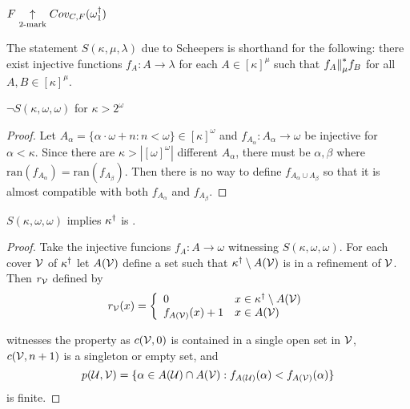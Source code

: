   \begin{corollary}
    $F\underset{2\text{-mark}}{\uparrow}Cov_{C,F}(\omega_1^\dagger)$
  \end{corollary}

  \begin{definition} 
    The statement $S(\kappa,\mu,\lambda)$ due to Scheepers is shorthand for the following: there exist injective functions $f_A:A\to\lambda$ for each $A\in[\kappa]^\mu$ such that $f_A{\parallel}^*_\mu f_B$ for all $A,B\in[\kappa]^\mu$.
  \end{definition}

  \begin{proposition}
    $\neg S(\kappa,\omega,\omega)$ for $\kappa>2^\omega$
  \end{proposition}

  \begin{proof}
    Let $A_\alpha=\{\alpha\cdot\omega+n:n<\omega\}\in[\kappa]^\omega$ and $f_{A_\alpha}:A_\alpha\to\omega$ be injective for $\alpha<\kappa$. Since there are $\kappa>|[\omega]^\omega|$ different $A_\alpha$, there must be $\alpha,\beta$ where $\text{ran}(f_{A_\alpha})=\text{ran}(f_{A_\beta})$. Then there is no way to define $f_{A_\alpha\cup A_\beta}$ so that it is almost compatible with both $f_{A_\alpha}$ and $f_{A_\beta}$.
  \end{proof}

  \begin{theorem}
    $S(\kappa,\omega,\omega)$ implies $\kappa^\dagger$ is \scish.
  \end{theorem}

  \begin{proof}
    Take the injective funcions $f_A:A\to\omega$ witnessing $S(\kappa,\omega,\omega)$. For each cover $\mathcal{V}$ of $\kappa^\dagger$ let $A(\mathcal{V})$ define a set such that $\kappa^\dagger\setminus A(\mathcal{V})$ is in a refinement of $\mathcal{V}$. Then $r_{\mathcal{V}}$ defined by 
      \[
        r_{\mathcal{V}}(x) = \left\{
      \begin{array}{ll}
        0 & x\in\kappa^\dagger\setminus A(\mathcal{V}) \\
        f_{A(\mathcal{V})}(x)+1 & x\in A(\mathcal{V})
      \end{array}
      \right.
      \] 

    witnesses the property as $c(\mathcal{V},0)$ is contained in a single open set in $\mathcal{V}$, $c(\mathcal{V},n+1)$ is a singleton or empty set, and
      \[
        p(\mathcal{U},\mathcal{V}) = \{\alpha\in A(\mathcal{U})\cap A(\mathcal{V}) : f_{A(\mathcal{U})}(\alpha)<f_{A(\mathcal{V})}(\alpha)\}
      \]
    is finite.
  \end{proof}

